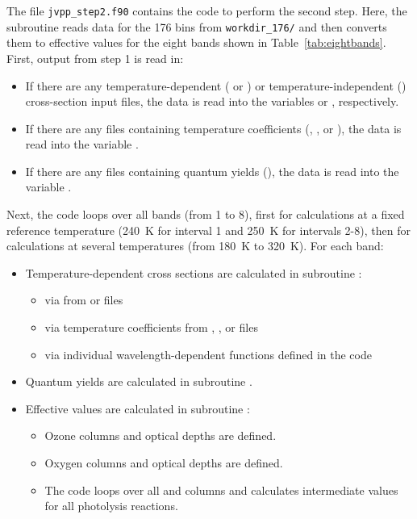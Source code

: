 \documentclass[a4paper,twoside]{article}
\def\nosep{\setlength\parsep{0mm}\setlength\topsep{0mm}\setlength\itemsep{0mm}}
\begin{document}
The file \verb|jvpp_step2.f90| contains the code to perform the second
step. Here, the subroutine  reads data for the 176
bins from \verb|workdir_176/| and then converts them to effective values
for the eight bands shown in Table~\ref{tab:eightbands}. First, output
from step 1 is read in:
\begin{itemize}
\item If there are any temperature-dependent ( or
  ) or temperature-independent () cross-section
  input files, the data is read into the variables  or
  , respectively.
\item If there are any files containing temperature coefficients
  (, , or ), the data is read into
  the variable .
\item If there are any files containing quantum yields (),
  the data is read into the variable .
\end{itemize}
Next, the code loops over all bands (from 1 to 8), first for
calculations at a fixed reference temperature (240~\unit{K} for interval
1 and 250~\unit{K} for intervals 2-8), then for calculations at several
temperatures (from 180~\unit{K} to 320~\unit{K}). For each band:
\begin{itemize}\nosep
\item Temperature-dependent cross sections  are calculated
  in subroutine :
  \begin{itemize}\nosep
  \item via  from  or  files
  \item via temperature coefficients  from ,
    , or  files
  \item via individual wavelength-dependent functions defined in the
    code
  \end{itemize}
\item Quantum yields are calculated in subroutine .
\item Effective values are calculated in subroutine :
  \begin{itemize}\nosep
  \item Ozone columns and optical depths  are defined.
  \item Oxygen columns and optical depths  are defined.
  \item The code loops over all  and  columns and
    calculates intermediate values for all photolysis reactions.
  \end{itemize}
\end{itemize}
\end{document}

